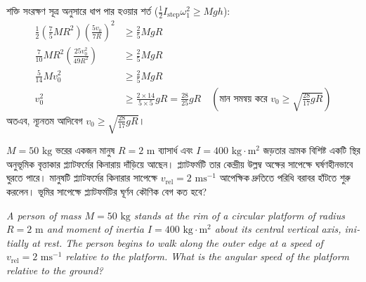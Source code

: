 \documentclass[12pt, a4paper]{article}
\begin{document}
{{\begin{tcolorbox}[solutionbox={সমাধান (Solution)}]
    শক্তি সংরক্ষণ সূত্র অনুসারে ধাপ পার হওয়ার শর্ত ($\frac{1}{2} I_{\text{step}} \omega_1^2 \ge M g h$):
    \begin{align*}
        \frac{1}{2} \left(\frac{7}{5} M R^2\right) \left(\frac{5 v_0}{7 R}\right)^2 &\ge \frac{2}{5} M g R \\
        \frac{7}{10} M R^2 \left(\frac{25 v_0^2}{49 R^2}\right) &\ge \frac{2}{5} M g R \\
        \frac{5}{14} M v_0^2 &\ge \frac{2}{5} M g R \\
        v_0^2 &\ge \frac{2 \times 14}{5 \times 5} g R = \frac{28}{25} g R \quad (\text{মান সমন্বয় করে } v_0 \ge \sqrt{\frac{28}{17} g R})
    \end{align*}
    অতএব, ন্যূনতম আদিবেগ $v_0 \ge \sqrt{\frac{28}{17} g R}$।
\end{tcolorbox}

\newpage

\begin{tcolorbox}[questionbox={প্রশ্ন (Question) 35}]
    \noindent
    $M = 50\text{ kg}$ ভরের একজন মানুষ $R = 2\text{ m}$ ব্যাসার্ধ এবং $I = 400\text{ kg}\cdot\text{m}^2$ জড়তার ভ্রামক বিশিষ্ট একটি স্থির অনুভূমিক বৃত্তাকার প্ল্যাটফর্মের কিনারায় দাঁড়িয়ে আছেন। প্ল্যাটফর্মটি তার কেন্দ্রীয় উল্লম্ব অক্ষের সাপেক্ষে ঘর্ষণহীনভাবে ঘুরতে পারে। মানুষটি প্ল্যাটফর্মের কিনারার সাপেক্ষে $v_{\text{rel}} = 2\text{ ms}^{-1}$ আপেক্ষিক দ্রুতিতে পরিধি বরাবর হাঁটতে শুরু করলেন। ভূমির সাপেক্ষে প্ল্যাটফর্মটির ঘূর্ণন কৌণিক বেগ কত হবে?
    
    \vspace{0.8em}
    \begin{english}
    \noindent\textit{\color{darkgray}
    A person of mass $M = 50\text{ kg}$ stands at the rim of a circular platform of radius $R = 2\text{ m}$ and moment of inertia $I = 400\text{ kg}\cdot\text{m}^2$ about its central vertical axis, initially at rest. The person begins to walk along the outer edge at a speed of $v_{\text{rel}} = 2\text{ ms}^{-1}$ relative to the platform. What is the angular speed of the platform relative to the ground?
    }
    \end{english}
\end{tcolorbox}

\vspace{1em}
\begin{center}
\end{center}}}
\end{document}
